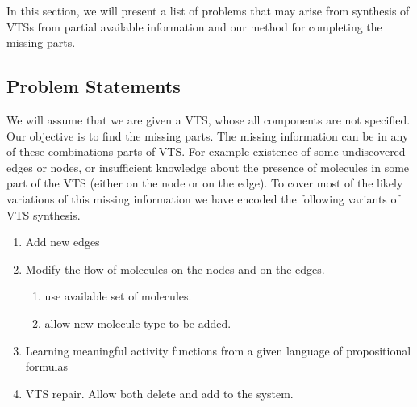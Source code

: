 In this section, we will present a list of problems that may arise from
synthesis of VTSs from partial available information
and our method for completing the missing parts.

\subsection{Problem Statements}

We will assume that we are given a VTS, whose all components
are not specified.
%
Our objective is to find the missing parts.
%
The missing information can be in any of these combinations parts of
VTS. For example existence of some undiscovered edges or nodes, or
insufficient knowledge about the presence of molecules in some part of
the VTS (either on the node or on the edge).
%
To cover most of the likely variations of this missing information we
have encoded the following variants of VTS synthesis.



%
%
\begin{enumerate}
\item  Add new edges 
\item  Modify the flow of molecules on the nodes and on the edges.
  \begin{enumerate}
  \item use available set of molecules.
  \item allow new molecule type to be added.     
  \end{enumerate}        
\item Learning meaningful activity functions from a given language of
  propositional formulas
\item  VTS repair. Allow both delete and add to the system.
\end{enumerate}


